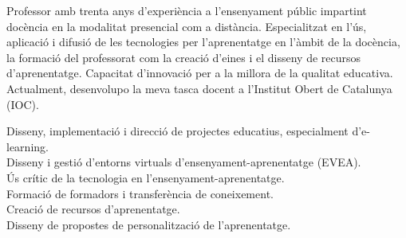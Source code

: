 \documentclass[9pt]{developercv} %
\begin{document}
\begin{minipage}[t]{0.275\textwidth} %
  \vspace{-\baselineskip} %

\end{minipage}

\vspace{0.5cm}


\begin{minipage}[t]{0.45\textwidth}
  \vspace{-\baselineskip} %


Professor amb trenta anys d'experiència a l'ensenyament públic impartint docència en la modalitat presencial com a distància. Especialitzat en l'ús, aplicació i difusió de les tecnologies per l'aprenentatge en l'àmbit de la docència, la formació del professorat com la creació d'eines i el disseny de recursos d'aprenentatge. Capacitat d'innovació per a la millora de la qualitat educativa.\\

Actualment, desenvolupo la meva tasca docent a l'Institut Obert de Catalunya (IOC).

\end{minipage}
\hfill
\begin{minipage}[t]{0.45\textwidth}
  \vspace{-\baselineskip} %
  
  
  Disseny, implementació i direcció de projectes educatius, especialment d’e-learning.\\
  Disseny i gestió d’entorns virtuals d’ensenyament-aprenentatge (EVEA).\\
  Ús crític de la tecnologia en l’ensenyament-aprenentatge.\\
  Formació de formadors i transferència de coneixement.\\
  Creació de recursos d’aprenentatge.\\
  Disseny de propostes de personalització de l’aprenentatge.\\

\end{minipage}
\end{document}
